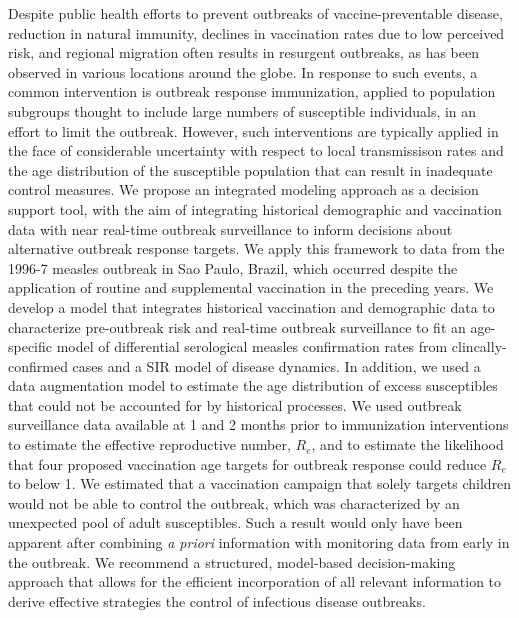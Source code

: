 Despite public health efforts to prevent outbreaks of vaccine-preventable disease, reduction in natural immunity, declines in vaccination rates due to low perceived risk, and regional migration often results in resurgent outbreaks, as has been observed in various locations around the globe. In response to such events, a common intervention is outbreak response immunization, applied to population subgroups thought to include large numbers of susceptible individuals, in an effort to limit the outbreak. However, such interventions are typically applied in the face of considerable uncertainty with respect to local transmissison rates and the age distribution of the susceptible population that can result in inadequate control measures. We propose an integrated modeling approach as a decision support tool, with the aim of integrating historical demographic and vaccination data with near real-time outbreak surveillance to inform decisions about alternative outbreak response targets. We apply this framework to data from the 1996-7 measles outbreak in Sao Paulo, Brazil, which occurred despite the application of routine and supplemental vaccination in the preceding years. We develop a model that integrates historical vaccination and demographic data to characterize pre-outbreak risk and real-time outbreak surveillance to fit an age-specific model of differential serological measles confirmation rates from clincally-confirmed cases and a SIR model of disease dynamics.  In addition, we used a data augmentation model to estimate the age distribution of excess susceptibles that could not be accounted for by historical processes. We used outbreak surveillance data available at 1 and 2 months prior to immunization interventions to estimate the effective reproductive number, \(R_e\), and to estimate the likelihood that four proposed vaccination age targets for outbreak response could reduce \(R_e\) to below 1.  We estimated that a vaccination campaign that solely targets children would not be able to control the outbreak, which was characterized by an unexpected pool of adult susceptibles. Such a result would only have been apparent after combining \textit{a priori} information with monitoring data from early in the outbreak. We recommend a structured, model-based decision-making approach that allows for the efficient incorporation of all relevant information to derive effective strategies the control of infectious disease outbreaks.